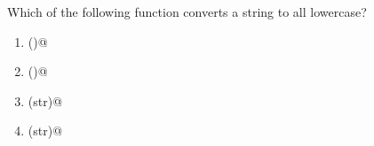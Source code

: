 \question
Which of the following function converts a string to all lowercase?

\begin{enumerate}
\item \lstinline@lower()@
\item \lstinline@lstrip()@
\item \lstinline@max(str)@
\item \lstinline@min(str)@
\end{enumerate}

